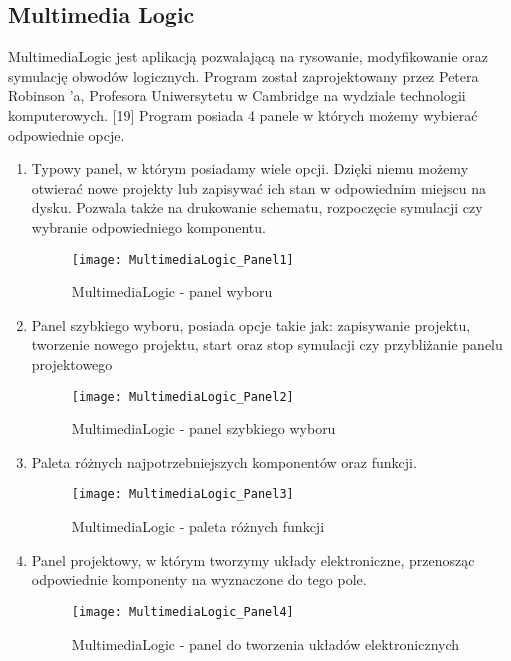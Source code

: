 \documentclass[12pt, a4paper, onside, polish]{article}				%
\begin{document}
\cleardoublepage

\subsection{Multimedia Logic}
\hspace{\parindent}
MultimediaLogic jest aplikacją pozwalającą na rysowanie, modyfikowanie oraz symulację obwodów logicznych.  Program został zaprojektowany przez Petera Robinson ’a, Profesora Uniwersytetu w Cambridge na wydziale technologii komputerowych. [19]  \newline\newline
Program posiada 4 panele w których możemy wybierać odpowiednie opcje.

 \begin{enumerate}
\item Typowy panel, w którym posiadamy wiele opcji. Dzięki niemu możemy otwierać nowe projekty lub zapisywać ich stan w odpowiednim miejscu na dysku. Pozwala także na drukowanie schematu, rozpoczęcie symulacji czy wybranie odpowiedniego komponentu.
  	\begin{figure}[H]
  	  {\centering \texttt{[image: MultimediaLogic\_Panel1]} \caption{MultimediaLogic - panel wyboru}}\vspace{5mm}
  	  \end{figure}
  	  
\item Panel szybkiego wyboru, posiada opcje takie jak: zapisywanie projektu, tworzenie nowego projektu, start oraz stop symulacji czy przybliżanie panelu projektowego
  	\begin{figure}[H]
  	  {\centering \texttt{[image: MultimediaLogic\_Panel2]} \caption{MultimediaLogic - panel szybkiego wyboru}}\vspace{5mm} 
  	 \end{figure}
  	 
  \cleardoublepage 	 
 \item Paleta różnych najpotrzebniejszych komponentów oraz funkcji. 
  	\begin{figure}[H]
  	  {\centering \texttt{[image: MultimediaLogic\_Panel3]} \caption{MultimediaLogic - paleta różnych funkcji}}\vspace{5mm}
  	 \end{figure}
  	 
\cleardoublepage
\item  Panel projektowy, w którym tworzymy układy elektroniczne, przenosząc odpowiednie komponenty na wyznaczone do tego pole.
  	\begin{figure}[H]
  	  {\centering \texttt{[image: MultimediaLogic\_Panel4]} \caption{MultimediaLogic - panel do tworzenia układów elektronicznych}}\vspace{5mm}
  	 \end{figure}
\end {enumerate}
\end{document}
